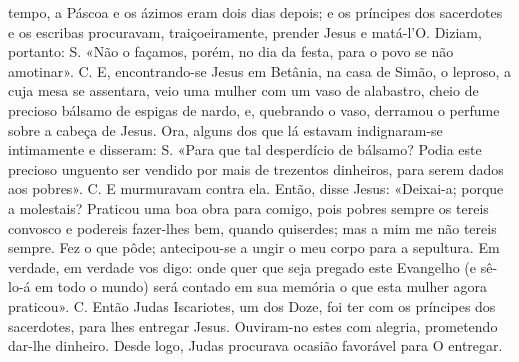 \begin{paracol}{2}
{ tempo, a Páscoa e os ázimos eram dois dias depois; e os príncipes dos sacerdotes e os escribas procuravam, traiçoeiramente, prender Jesus e matá-l’O. Diziam, portanto: {\redx S.} «Não o façamos, porém, no dia da festa, para o povo se não amotinar». {\redx C.} E, encontrando-se Jesus em Betânia, na casa de Simão, o leproso, a cuja mesa se assentara, veio uma mulher com um vaso de alabastro, cheio de precioso bálsamo de espigas de nardo, e, quebrando o vaso, derramou o perfume sobre a cabeça de Jesus. Ora, alguns dos que lá estavam indignaram-se intimamente e disseram: {\redx S.} «Para que tal desperdício de bálsamo? Podia este precioso unguento ser vendido por mais de trezentos dinheiros, para serem dados aos pobres». {\redx C.} E murmuravam contra ela. Então, disse Jesus: \cruz «Deixai-a; porque a molestais? Praticou uma boa obra para comigo, pois pobres sempre os tereis convosco e podereis fazer-lhes bem, quando quiserdes; mas a mim me não tereis sempre. Fez o que pôde; antecipou-se a ungir o meu corpo para a sepultura. Em verdade, em verdade vos digo: onde quer que seja pregado este Evangelho (e sê-lo-á em todo o mundo) será contado em sua memória o que esta mulher agora praticou». {\redx C.} Então Judas Iscariotes, um dos Doze, foi ter com os príncipes dos sacerdotes, para lhes entregar Jesus. Ouviram-no estes com alegria, prometendo dar-lhe dinheiro. Desde logo, Judas procurava ocasião favorável para O entregar.
}\switchcolumn*{}\switchcolumn{}
\end{paracol}
